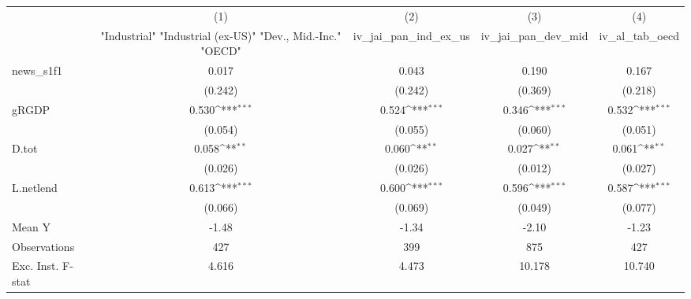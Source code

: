 {
\def\sym#1{\ifmmode^{#1}\else\(^{#1}\)\fi}
\begin{tabular}{l*{4}{c}}
\toprule
            &\multicolumn{1}{c}{(1)}&\multicolumn{1}{c}{(2)}&\multicolumn{1}{c}{(3)}&\multicolumn{1}{c}{(4)}\\
            &\multicolumn{1}{c}{ "Industrial" "Industrial (ex-US)" "Dev., Mid.-Inc." "OECD" }&\multicolumn{1}{c}{iv\_jai\_pan\_ind\_ex\_us}&\multicolumn{1}{c}{iv\_jai\_pan\_dev\_mid}&\multicolumn{1}{c}{iv\_al\_tab\_oecd}\\
\midrule
news\_s1f1   &       0.017         &       0.043         &       0.190         &       0.167         \\
            &     (0.242)         &     (0.242)         &     (0.369)         &     (0.218)         \\
\addlinespace
gRGDP       &       0.530\sym{***}&       0.524\sym{***}&       0.346\sym{***}&       0.532\sym{***}\\
            &     (0.054)         &     (0.055)         &     (0.060)         &     (0.051)         \\
\addlinespace
D.tot       &       0.058\sym{**} &       0.060\sym{**} &       0.027\sym{**} &       0.061\sym{**} \\
            &     (0.026)         &     (0.026)         &     (0.012)         &     (0.027)         \\
\addlinespace
L.netlend   &       0.613\sym{***}&       0.600\sym{***}&       0.596\sym{***}&       0.587\sym{***}\\
            &     (0.066)         &     (0.069)         &     (0.049)         &     (0.077)         \\
\midrule
Mean Y      &       -1.48         &       -1.34         &       -2.10         &       -1.23         \\
Observations&         427         &         399         &         875         &         427         \\
Exc. Inst. F-stat&       4.616         &       4.473         &      10.178         &      10.740         \\
\bottomrule
\end{tabular}
}
